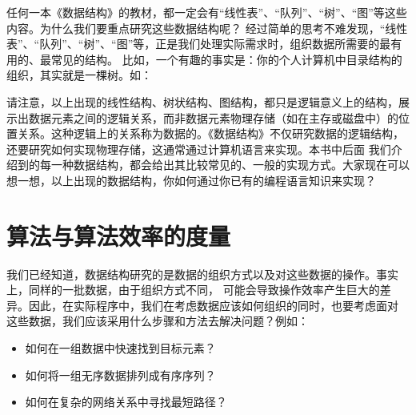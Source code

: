 任何一本《数据结构》的教材，都一定会有“线性表”、“队列”、“树”、“图”等这些内容。为什么我们要重点研究这些数据结构呢？
经过简单的思考不难发现，“线性表”、“队列”、“树”、“图”等，正是我们处理实际需求时，组织数据所需要的最有用的、最常见的结构。
比如，一个有趣的事实是：你的个人计算机中目录结构的组织，其实就是一棵树。如：
\begin{bulk}
\begin{center}
\end{center}
\end{bulk}
请注意，以上出现的线性结构、树状结构、图结构，都只是逻辑意义上的结构，展示出数据元素之间的逻辑关系，而非数据元素物理存储（如在主存或磁盘中）的位
置关系。这种逻辑上的关系称为数据的。《数据结构》不仅研究数据的逻辑结构，还要研究如何实现物理存储，这通常通过计算机语言来实现。本书中后面
我们介绍到的每一种数据结构，都会给出其比较常见的、一般的实现方式。大家现在可以想一想，以上出现的数据结构，你如何通过你已有的编程语言知识来实现？

\section{算法与算法效率的度量}
我们已经知道，数据结构研究的是数据的组织方式以及对这些数据的操作。事实上，同样的一批数据，由于组织方式不同，
可能会导致操作效率产生巨大的差异。因此，在实际程序中，我们在考虑数据应该如何组织的同时，也要考虑面对
这些数据，我们应该采用什么步骤和方法去解决问题？例如：
\begin{itemize}[itemsep=0pt,
    parsep=0pt,
    topsep=0pt]
    \item 如何在一组数据中快速找到目标元素？
    \item 如何将一组无序数据排列成有序序列？
    \item 如何在复杂的网络关系中寻找最短路径？
\end{itemize}

